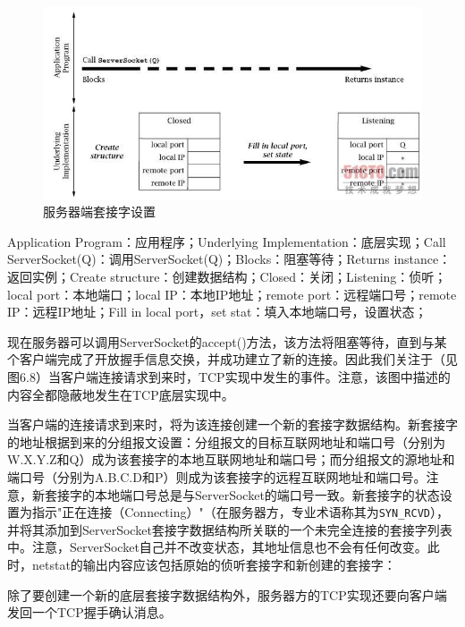 		

		\begin{figure}[htbp]%
			\centering
			\includegraphics[scale=.6]{img/06.07.jpg}
			\caption{服务器端套接字设置}
			\label{fig:server.create.socket}
		\end{figure}

		Application Program：应用程序；Underlying Implementation：底层实现；Call ServerSocket(Q)：调用ServerSocket(Q)；Blocks：阻塞等待；Returns instance：返回实例；Create structure：创建数据结构；Closed：关闭；Listening：侦听；local port：本地端口；local IP：本地IP地址；remote port：远程端口号；remote IP：远程IP地址；Fill in local port，set stat：填入本地端口号，设置状态；

		现在服务器可以调用ServerSocket的accept()方法，该方法将阻塞等待，直到与某个客户端完成了开放握手信息交换，并成功建立了新的连接。因此我们关注于（见图6.8）当客户端连接请求到来时，TCP实现中发生的事件。注意，该图中描述的内容全都隐蔽地发生在TCP底层实现中。

		当客户端的连接请求到来时，将为该连接创建一个新的套接字数据结构。新套接字的地址根据到来的分组报文设置：分组报文的目标互联网地址和端口号（分别为W.X.Y.Z和Q）成为该套接字的本地互联网地址和端口号；而分组报文的源地址和端口号（分别为A.B.C.D和P）则成为该套接字的远程互联网地址和端口号。注意，新套接字的本地端口号总是与ServerSocket的端口号一致。新套接字的状态设置为指示"正在连接（Connecting）"（在服务器方，专业术语称其为\verb|SYN_RCVD|），并将其添加到ServerSocket套接字数据结构所关联的一个未完全连接的套接字列表中。注意，ServerSocket自己并不改变状态，其地址信息也不会有任何改变。此时，netstat的输出内容应该包括原始的侦听套接字和新创建的套接字：

		

		除了要创建一个新的底层套接字数据结构外，服务器方的TCP实现还要向客户端发回一个TCP握手确认消息。

